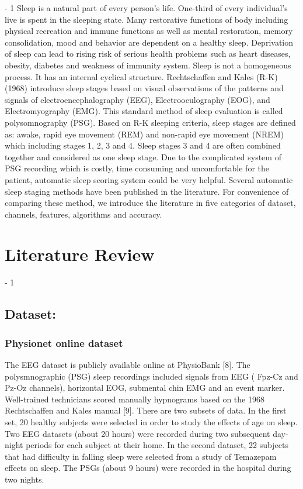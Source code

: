 \documentclass[12pt,letterpaper]{article}
\begin{document}
\looseness - 1
Sleep is a natural part of every person's life. One-third of every individual's live is spent in the sleeping state. Many restorative functions of body including physical recreation and immune functions as well as mental restoration, memory consolidation, mood and behavior are dependent on a healthy sleep. Deprivation of sleep can lead to rising risk of serious health problems such as heart diseases, obesity, diabetes and weakness of immunity system. 
Sleep is not a homogeneous process. It has an internal cyclical structure. Rechtschaffen and Kales (R-K) (1968) introduce sleep stages based on visual observations of the patterns and signals of electroencephalography (EEG), Electrooculography (EOG), and Electromyography (EMG). This standard method of sleep evaluation is called polysomnography (PSG). Based on R-K sleeping criteria, sleep stages are defined as: awake, rapid eye movement (REM) and non-rapid eye movement (NREM) which including stages 1, 2, 3 and 4. Sleep stages 3 and 4 are often combined together and considered as one sleep stage. Due to the complicated system of PSG recording which is costly, time consuming and uncomfortable for the patient, automatic sleep scoring system could be very helpful. Several automatic sleep staging methods have been published in the literature. For convenience of comparing these method, we introduce the literature in five categories of dataset, channels, features, algorithms and accuracy.
 
\section*{Literature Review}
\looseness - 1
\subsection*{ Dataset:}

\subsubsection*{Physionet online dataset}

The EEG dataset is publicly available online at PhysioBank [8]. The polysmnographic (PSG) sleep recordings included signals from EEG ( Fpz-Cz and Pz-Oz channels), horizontal EOG, submental chin EMG and an event marker. Well-trained technicians scored manually hypnograms based on the 1968 Rechtschaffen and Kales manual [9].
There are two subsets of data. In the first set, 20 healthy subjects were selected in order to study the effects of age on sleep. Two EEG datasets (about 20 hours) were recorded during two subsequent day-night periods for each subject at their home. In the second dataset, 22 subjects that had difficulty in falling sleep were selected from a study of Temazepam effects on sleep. The PSGs (about 9 hours) were recorded in the hospital during two nights.
\end{document}
